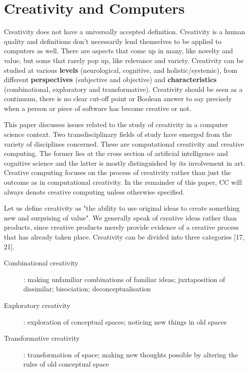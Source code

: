 
\pagestyle{fancy}

\chapter{Creativity and Computers}

Creativity does not have a universally accepted definition. Creativity is a human quality and definitions don’t necessarily lend themselves to be applied to computers as well. There are aspects that come up in many, like novelty and value, but some that rarely pop up, like relevance and variety. Creativity can be studied at various \textbf{levels} (neurological, cognitive, and holistic/systemic), from different \textbf{perspectives} (subjective and objective) and \textbf{characteristics} (combinational, exploratory and transformative). Creativity should be seen as a continuum, there is no clear cut-off point or Boolean answer to say precisely when a person or piece of software has become creative or not.

This paper discusses issues related to the study of creativity in a computer science context. Two transdisciplinary fields of study have emerged from the variety of disciplines concerned. These are computational creativity and creative computing. The former lies at the cross section of artificial intelligence and cognitive science and the latter is mostly distinguished by its involvement in art. Creative computing focuses on the process of creativity rather than just the outcome as in computational creativity. In the remainder of this paper, CC will always denote creative computing unless otherwise specified.

Let us define creativity as "the ability to use original ideas to create something new and surprising of value". We generally speak of creative ideas rather than products, since creative products merely provide evidence of a creative process that has already taken place. Creativity can be divided into three categories \citep{Boden2003}[17, 21].

\begin{description}
  \item [Combinational creativity]: making unfamiliar combinations of familiar ideas; juxtaposition of dissimilar; bisociation; deconceptualisation
  \item [Exploratory creativity]: exploration of conceptual spaces; noticing new things in old spaces
  \item [Transformative creativity]: transformation of space; making new thoughts possible by altering the rules of old conceptual space
\end{description}

